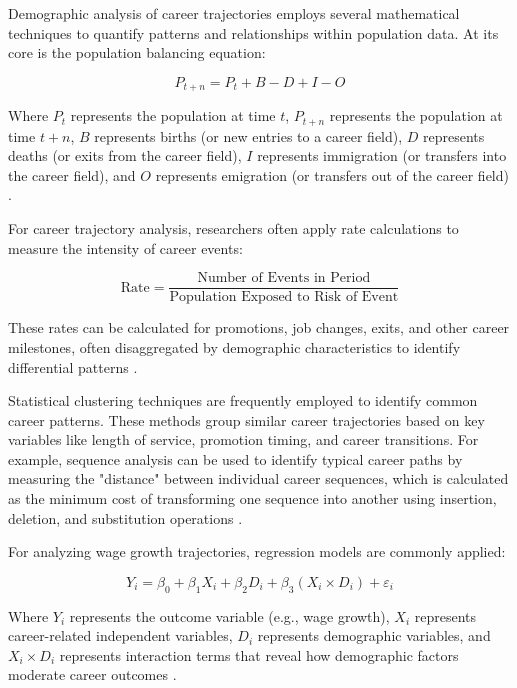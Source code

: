 \documentclass[../main.tex]{subfiles}
\begin{document}
Demographic analysis of career trajectories employs several mathematical techniques to quantify patterns and relationships within population data. At its core is the population balancing equation:

\begin{equation}
P_{t+n} = P_t + B - D + I - O
\end{equation}

Where $P_t$ represents the population at time $t$, $P_{t+n}$ represents the population at time $t+n$, $B$ represents births (or new entries to a career field), $D$ represents deaths (or exits from the career field), $I$ represents immigration (or transfers into the career field), and $O$ represents emigration (or transfers out of the career field) \parencite{land2019mathematical,vanwissen2016dissertation}.

For career trajectory analysis, researchers often apply rate calculations to measure the intensity of career events:

\begin{equation}
\text{Rate} = \frac{\text{Number of Events in Period}}{\text{Population Exposed to Risk of Event}}
\end{equation}

These rates can be calculated for promotions, job changes, exits, and other career milestones, often disaggregated by demographic characteristics to identify differential patterns \parencite{gale2024demographics,land2019mathematical}.

Statistical clustering techniques are frequently employed to identify common career patterns. These methods group similar career trajectories based on key variables like length of service, promotion timing, and career transitions. For example, sequence analysis can be used to identify typical career paths by measuring the "distance" between individual career sequences, which is calculated as the minimum cost of transforming one sequence into another using insertion, deletion, and substitution operations \parencite{nataraj2018career}.

For analyzing wage growth trajectories, regression models are commonly applied:

\begin{equation}
Y_i = \beta_0 + \beta_1 X_i + \beta_2 D_i + \beta_3 (X_i \times D_i) + \varepsilon_i
\end{equation}

Where $Y_i$ represents the outcome variable (e.g., wage growth), $X_i$ represents career-related independent variables, $D_i$ represents demographic variables, and $X_i \times D_i$ represents interaction terms that reveal how demographic factors moderate career outcomes \parencite{dol2023building,baker2023demographic}.
\end{document}

